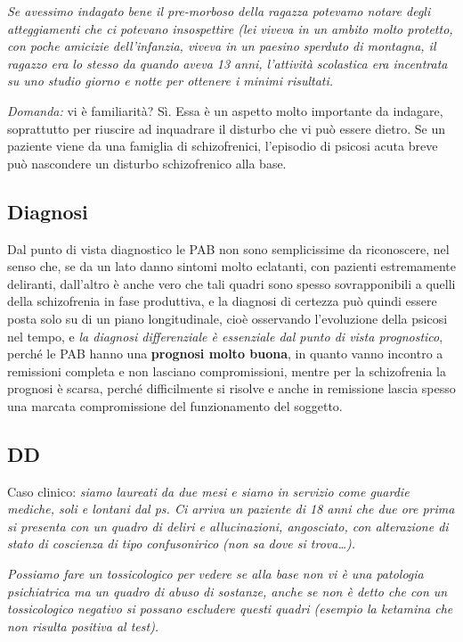 \emph{Se avessimo indagato bene il pre-morboso della ragazza potevamo
notare degli atteggiamenti che ci potevano insospettire (lei viveva in
un ambito molto protetto, con poche amicizie dell'infanzia, viveva in un
paesino sperduto di montagna, il ragazzo era lo stesso da quando aveva
13 anni, l'attività scolastica era incentrata su uno studio giorno e
notte per ottenere i minimi risultati. }

\emph{Domanda:} vi è familiarità? Sì. Essa è un aspetto molto importante
da indagare, soprattutto per riuscire ad inquadrare il disturbo che vi
può essere dietro. Se un paziente viene da una famiglia di
schizofrenici, l'episodio di psicosi acuta breve può nascondere un
disturbo schizofrenico alla base.

\subsection{Diagnosi}

Dal punto di vista diagnostico le PAB non sono semplicissime da
riconoscere, nel senso che, se da un lato danno sintomi molto eclatanti,
con pazienti estremamente deliranti, dall'altro è anche vero che tali
quadri sono spesso sovrapponibili a quelli della schizofrenia in fase
produttiva, e la diagnosi di certezza può quindi essere posta solo su di
un piano longitudinale, cioè osservando l'evoluzione della psicosi nel
tempo, e \emph{la diagnosi differenziale è essenziale dal punto di vista
prognostico}, perché le PAB hanno una \textbf{prognosi molto buona}, in
quanto vanno incontro a remissioni completa e non lasciano
compromissioni, mentre per la schizofrenia la prognosi è scarsa, perché
difficilmente si risolve e anche in remissione lascia spesso una marcata
compromissione del funzionamento del soggetto.

\subsection{DD}

Caso clinico: \emph{siamo laureati da due mesi e siamo in servizio come
guardie mediche, soli e lontani dal ps. Ci arriva un paziente di 18 anni
che due ore prima si presenta con un quadro di deliri e allucinazioni,
angosciato, con alterazione di stato di coscienza di tipo confusonirico
(non sa dove si trova\ldots{}). }

\emph{Possiamo fare un \emph{tossicologico} per vedere se alla base non
vi è una patologia psichiatrica ma un quadro di abuso di sostanze, anche
se non è detto che con un tossicologico negativo si possano escludere
questi quadri (esempio la ketamina che non risulta positiva al test).}

